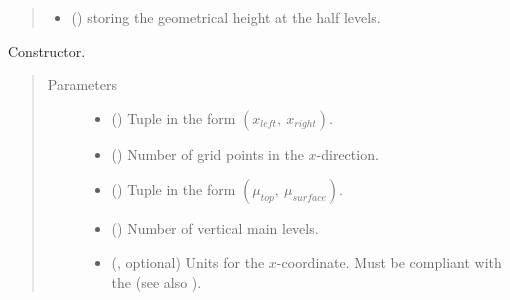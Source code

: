 \documentclass[letterpaper,10pt,english]{sphinxmanual}
\begin{document}
\begin{fulllineitems}
\begin{quote}
\begin{description}
\begin{itemize}
\item {} 
 () \textendash{}  storing the geometrical
height at the half levels.

\end{itemize}

\end{description}\end{quote}

\begin{fulllineitems}
\label{\detokenize{api:grids.sleve.SLEVE2d.__init__}}
Constructor.
\begin{quote}\begin{description}
\item[{Parameters}] \leavevmode\begin{itemize}
\item {} 
 () \textendash{} Tuple in the form \((x_{left}, ~ x_{right})\).

\item {} 
 () \textendash{} Number of grid points in the \(x\)-direction.

\item {} 
 () \textendash{} Tuple in the form \((\mu_{top}, ~ \mu_{surface})\).

\item {} 
 () \textendash{} Number of vertical main levels.

\item {} 
 (, optional) \textendash{} 
Units for the \(x\)-coordinate. Must be compliant
with the  (see also
{\hyperref[\detokenize{api:grids.axis.Axis.__init__}]{}}).



\end{itemize}
\end{description}
\end{quote}
\end{fulllineitems}
\end{fulllineitems}
\end{document}
